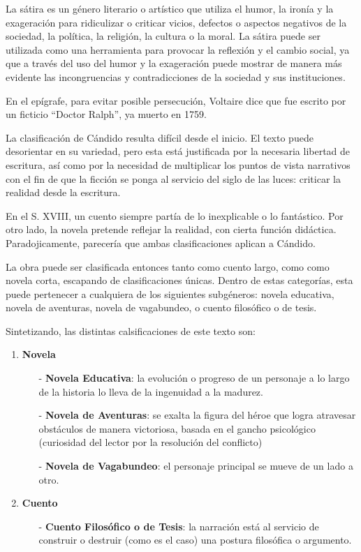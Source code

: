 \documentclass{article}
\begin{document}
La sátira es un género literario o artístico que utiliza el humor, la ironía y la exageración para ridiculizar o criticar vicios, defectos o aspectos negativos de la sociedad, la política, la religión, la cultura o la moral. La sátira puede ser utilizada como una herramienta para provocar la reflexión y el cambio social, ya que a través del uso del humor y la exageración puede mostrar de manera más evidente las incongruencias y contradicciones de la sociedad y sus instituciones.

En el epígrafe, para evitar posible persecución, Voltaire dice que fue escrito por un ficticio ``Doctor Ralph'', ya muerto en 1759.

La clasificación de Cándido resulta difícil desde el inicio. El  texto puede desorientar en su variedad, pero esta está justificada por la necesaria libertad de escritura, así como por la necesidad de multiplicar los puntos de vista narrativos con el fin de que la ficción se ponga al servicio del siglo de las luces: criticar la realidad desde la escritura.

En el S. XVIII, un cuento siempre partía de lo inexplicable o lo fantástico. Por otro lado, la novela pretende reflejar la realidad, con cierta función didáctica. Paradojicamente, parecería que ambas clasificaciones aplican a Cándido.

La obra puede ser clasificada entonces tanto como cuento largo, como como novela corta, escapando de clasificaciones únicas. Dentro de estas categorías, esta puede pertenecer a cualquiera de los siguientes subgéneros: novela educativa, novela de aventuras, novela de vagabundeo, o cuento filosófico o de tesis.

Sintetizando, las distintas calsificaciones de este texto son: 

\begin{enumerate}
    \item \textbf{Novela}
    \begin{itemize}
        \item[-] \textbf{Novela Educativa}: la evolución o progreso de un personaje a lo largo de la historia lo lleva de la ingenuidad a la madurez.
        \item[-] \textbf{Novela de Aventuras}: se exalta la figura del héroe que logra atravesar obstáculos de manera victoriosa, basada en el gancho psicológico (curiosidad del lector por la resolución del conflicto)
        \item[-] \textbf{Novela de Vagabundeo}: el personaje principal se mueve de un lado a otro.
    \end{itemize} 
    \item \textbf{Cuento}
    \begin{itemize}
        \item[-] \textbf{Cuento Filosófico o de Tesis}: la narración está al servicio de construir o destruir (como es el caso) una postura filosófica o argumento.
    \end{itemize} 
\end{enumerate}
\end{document}
